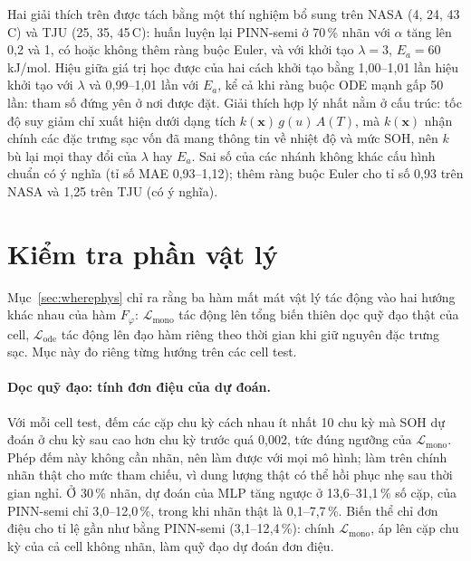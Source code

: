 \documentclass[12pt,a4paper,oneside]{report}
\theoremstyle{plain}
\theoremstyle{definition}
\begin{document}
Hai giải thích trên được tách bằng một thí nghiệm bổ sung trên NASA (4, 24, 43\,\textdegree C) và TJU (25, 35,
45\,\textdegree C): huấn luyện lại PINN-semi ở 70\,\% nhãn với $\alpha$ tăng lên 0{,}2 và 1, có hoặc không thêm ràng buộc
Euler, và với khởi tạo $\lambda = 3$, $E_a = 60$\,kJ/mol. Hiệu giữa giá trị học được của hai cách khởi tạo bằng 1{,}00--1{,}01 lần
hiệu khởi tạo với $\lambda$ và 0{,}99--1{,}01 lần với $E_a$, kể cả khi ràng buộc ODE mạnh gấp 50 lần: tham số đứng yên ở nơi được
đặt. Giải thích hợp lý nhất nằm ở cấu trúc: tốc độ suy giảm chỉ xuất hiện dưới dạng tích $k(\mathbf{x})\,g(u)\,A(T)$, mà
$k(\mathbf{x})$ nhận chính các đặc trưng sạc vốn đã mang thông tin về nhiệt độ và mức SOH, nên $k$ bù lại mọi thay đổi
của $\lambda$ hay $E_a$. Sai số của các nhánh không khác cấu hình chuẩn có ý nghĩa (tỉ số MAE 0{,}93--1{,}12); thêm ràng buộc Euler cho tỉ số 0{,}93 trên NASA và 1{,}25 trên TJU (có ý nghĩa).
\section{Kiểm tra phần vật lý}\label{sec:physcheck}

Mục~\ref{sec:wherephys} chỉ ra rằng ba hàm mất mát vật lý tác động vào hai hướng khác nhau của hàm $F_\varphi$:
$\mathcal{L}_\text{mono}$ tác động lên tổng biến thiên dọc quỹ đạo thật của cell, $\mathcal{L}_\text{ode}$ tác động
lên đạo hàm riêng theo thời gian khi giữ nguyên đặc trưng sạc. Mục này đo riêng từng hướng trên các cell test.

\paragraph{Dọc quỹ đạo: tính đơn điệu của dự đoán.} Với mỗi cell test, đếm các cặp chu kỳ cách nhau ít nhất 10 chu
kỳ mà SOH dự đoán ở chu kỳ sau cao hơn chu kỳ trước quá 0,002, tức đúng ngưỡng của $\mathcal{L}_\text{mono}$. Phép
đếm này không cần nhãn, nên làm được với mọi mô hình; làm trên chính nhãn thật cho mức tham chiếu, vì dung lượng
thật có thể hồi phục nhẹ sau thời gian nghỉ. Ở 30\,\% nhãn, dự đoán của
MLP tăng ngược ở 13{,}6--31{,}1\,\% số cặp, của PINN-semi chỉ 3{,}0--12{,}0\,\%, trong khi nhãn thật là 0{,}1--7{,}7\,\%.
Biến thể chỉ đơn điệu cho tỉ lệ gần như bằng PINN-semi (3{,}1--12{,}4\,\%): chính $\mathcal{L}_\text{mono}$, áp lên cặp chu kỳ của cả cell không nhãn, làm quỹ đạo dự đoán đơn điệu.
\end{document}
